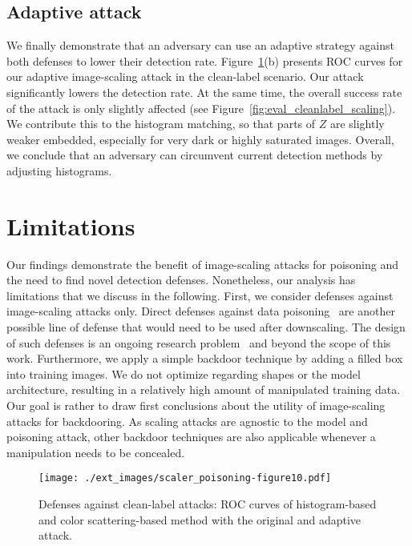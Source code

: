 \documentclass[conference]{IEEEtran}
\newcommand{\ti}{\ensuremath{Z}\xspace}
\begin{document}
\subsection{Adaptive attack}
We finally demonstrate that an adversary can use an adaptive strategy 
against both defenses to lower their detection rate.
Figure~\ref{fig:results_detection_cleanlabel}(b) presents ROC curves 
for our adaptive image-scaling attack in the clean-label scenario. Our 
attack significantly lowers the detection rate. At the same time, the 
overall success rate of the attack is only slightly affected (see 
Figure~\ref{fig:eval_cleanlabel_scaling}). We contribute this to the 
histogram matching, so that parts of $\ti$ are slightly weaker 
embedded, especially for very dark or highly saturated images.
Overall, we conclude that an adversary can 
circumvent current detection methods by adjusting histograms. 

\section{Limitations}\label{sec:limitations}
Our findings demonstrate the benefit of image-scaling attacks 
for poisoning and the need to find novel detection defenses. 
Nonetheless, our analysis has limitations that we discuss in the 
following.
First, we consider defenses against image-scaling attacks only. Direct 
defenses against data poisoning~\citep[e.g.][]{WanYaoShaLi+19} are 
another possible line of defense that would need to be used after 
downscaling. The design of such defenses is an ongoing 
research problem~\citep{WanYaoShaLi+19,TanSho19} and beyond the scope 
of this work.
Furthermore, we apply a simple backdoor technique by adding a filled 
box into training images. We do not optimize regarding shapes or the 
model architecture, resulting in a relatively high amount of 
manipulated training data. Our goal is rather to draw first conclusions 
about the utility of image-scaling attacks for backdooring. As 
scaling attacks are agnostic to the model and poisoning attack, other 
backdoor techniques are also applicable whenever a manipulation needs 
to be concealed.


\begin{figure}
	\centering
	\texttt{[image: ./ext\_images/scaler\_poisoning-figure10.pdf]}
	\vspace{-0.85em}
	\caption{Defenses against clean-label attacks: ROC curves of 
		histogram-based and color scattering-based method with the 
		original 
		and adaptive attack.}
	\label{fig:results_detection_cleanlabel}
\end{figure}
\end{document}
